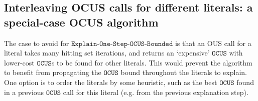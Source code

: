 \documentclass[a4paper,UKenglish,cleveref, autoref, thm-restate, pdfa]{lipics-v2021}
\newcommand\m[1]{\mathcal{#1}}
\renewcommand\comment[1]{}
\newcommand{\emilio}[1]{{\comment{\color{red}Emilio: #1}}}
\newcommand\setstohit{\ensuremath{\m{H} }\xspace}
\newcommand\Iend{\ensuremath{I_\mathit{end} }\xspace}
\newcommand\formula{\ensuremath{\m{F} }\xspace}
\newcommand\formulac{\ensuremath{\m{C} }\xspace}
\newcommand\mm[1]{\ensuremath{#1}\xspace}
\newcommand\call[1]{\mm{\texttt{#1}}}
\newcommand\omus{\mm{\call{OUS}}}
\newcommand\comus{\mm{\call{OCUS}}}
\newcommand\ousb{\mm{\call{OCUS\_Bounded}}}
\newcommand\onestepomusbounded{\ensuremath{\call{Explain-One-Step-OCUS-Bounded}}\xspace}
\begin{document}
%
%
%



%

\subsection{Interleaving OCUS calls for different literals: a special-case OCUS algorithm} 
The case to avoid for \onestepomusbounded{} is that an OUS call for a literal takes many hitting set iterations, and returns an `expensive' \comus with lower-cost \comus{s} to be found for other literals. 
This would prevent the algorithm to benefit from propagating the \comus bound throughout the literals to explain. 
One option is to order the literals by some heuristic, such as the best \comus found in a previous \comus call for this literal (e.g. from the previous explanation step). 
\end{document}
